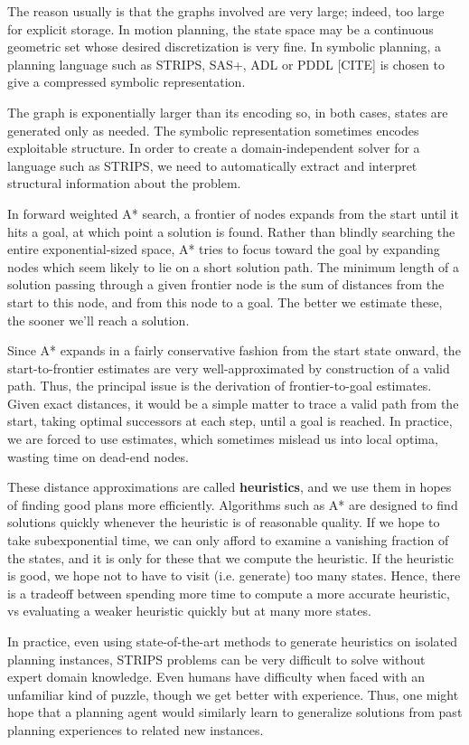 \documentclass[letterpaper]{article}
\begin{document}
The reason usually is that the graphs involved are very large; indeed, too large for explicit storage.
In motion planning, the state space may be a continuous geometric set whose desired discretization is very fine.
In symbolic planning, a planning language such as STRIPS, SAS+, ADL or PDDL [CITE] is chosen to give a compressed symbolic representation.

The graph is exponentially larger than its encoding so, in both cases, states are generated only as needed.
The symbolic representation sometimes encodes exploitable structure.
In order to create a domain-independent solver for a language such as STRIPS, we need to automatically extract and interpret structural information about the problem. 

In forward weighted A* search, a frontier of nodes expands from the start until it hits a goal, at which point a solution is found.
Rather than blindly searching the entire exponential-sized space, A* tries to focus toward the goal by expanding nodes which seem likely to lie on a short solution path.
The minimum length of a solution passing through a given frontier node is the sum of distances from the start to this node, and from this node to a goal.
The better we estimate these, the sooner we'll reach a solution.

Since A* expands in a fairly conservative fashion from the start state onward, the start-to-frontier estimates are very well-approximated by construction of a valid path.
Thus, the principal issue is the derivation of frontier-to-goal estimates.
Given exact distances, it would be a simple matter to trace a valid path from the start, taking optimal successors at each step, until a goal is reached.
In practice, we are forced to use estimates, which sometimes mislead us into local optima, wasting time on dead-end nodes.

These distance approximations are called \textbf{heuristics}, and we use them in hopes of finding good plans more efficiently.
Algorithms such as A* are designed to find solutions quickly whenever the heuristic is of reasonable quality.
If we hope to take subexponential time, we can only afford to examine a vanishing fraction of the states, and it is only for these that we compute the heuristic.
If the heuristic is good, we hope not to have to visit (i.e. generate) too many states.
Hence, there is a tradeoff between spending more time to compute a more accurate heuristic, vs evaluating a weaker heuristic quickly but at many more states.

In practice, even using state-of-the-art methods to generate heuristics on isolated planning instances, STRIPS problems can be very difficult to solve without expert domain knowledge.
Even humans have difficulty when faced with an unfamiliar kind of puzzle, though we get better with experience.
Thus, one might hope that a planning agent would similarly learn to generalize solutions from past planning experiences to related new instances.
\end{document}
